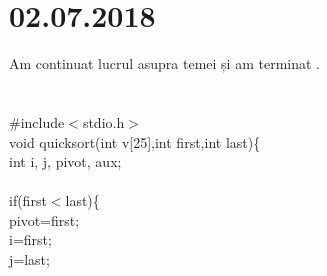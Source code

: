 \documentclass{report}
\begin{document}
\chapter{02.07.2018}
Am continuat lucrul asupra temei și am terminat .\\
\\
\\
\#include\(<\)stdio.h\(>\)\\
void quicksort(int v[25],int first,int last)\{\\
 int i, j, pivot, aux;\\
   \\

   if(first\(<\)last)\{\\
      pivot=first;\\
      i=first;\\
      j=last;\\
\end{document}
